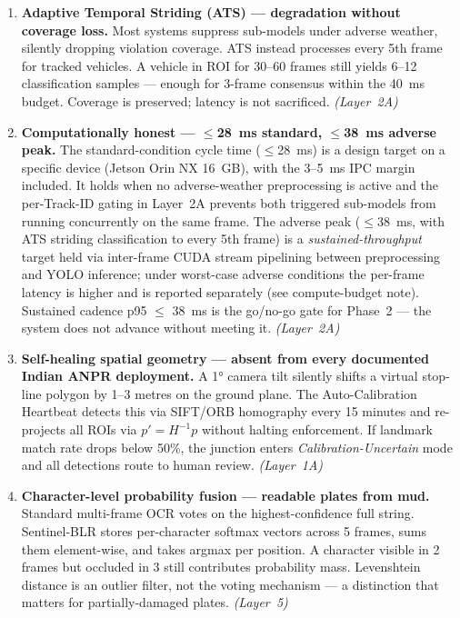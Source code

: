 \documentclass[11pt,a4paper]{article}
\begin{document}
\begin{enumerate}[leftmargin=1.8em, itemsep=0.6em]

    \item \textbf{Adaptive Temporal Striding (ATS) — degradation without coverage loss.}
    Most systems suppress sub-models under adverse weather, silently dropping violation coverage. ATS instead processes every 5th frame for tracked vehicles. A vehicle in ROI for 30–60 frames still yields 6–12 classification samples — enough for 3-frame consensus within the 40~ms budget. Coverage is preserved; latency is not sacrificed. \textit{(Layer~2A)}

    \item \textbf{Computationally honest — $\leq$28~ms standard, $\leq$38~ms adverse peak.}
    The standard-condition cycle time ($\leq$28~ms) is a design target on a specific device (Jetson Orin NX 16~GB), with the 3--5~ms IPC margin included. It holds when no adverse-weather preprocessing is active and the per-Track-ID gating in Layer~2A prevents both triggered sub-models from running concurrently on the same frame. The adverse peak ($\leq$38~ms, with ATS striding classification to every 5th frame) is a \emph{sustained-throughput} target held via inter-frame CUDA stream pipelining between preprocessing and YOLO inference; under worst-case adverse conditions the per-frame latency is higher and is reported separately (see compute-budget note). Sustained cadence p95 $\leq$ 38~ms is the go/no-go gate for Phase~2 --- the system does not advance without meeting it. \textit{(Layer~2A)}

    \item \textbf{Self-healing spatial geometry — absent from every documented Indian ANPR deployment.}
    A 1° camera tilt silently shifts a virtual stop-line polygon by 1–3 metres on the ground plane. The Auto-Calibration Heartbeat detects this via SIFT/ORB homography every 15 minutes and re-projects all ROIs via $p' = H^{-1}p$ without halting enforcement. If landmark match rate drops below 50\%, the junction enters \textit{Calibration-Uncertain} mode and all detections route to human review. \textit{(Layer~1A)}

    \item \textbf{Character-level probability fusion — readable plates from mud.}
    Standard multi-frame OCR votes on the highest-confidence full string. Sentinel-BLR stores per-character softmax vectors across 5 frames, sums them element-wise, and takes argmax per position. A character visible in 2 frames but occluded in 3 still contributes probability mass. Levenshtein distance is an outlier filter, not the voting mechanism — a distinction that matters for partially-damaged plates. \textit{(Layer~5)}


\end{enumerate}
\end{document}
